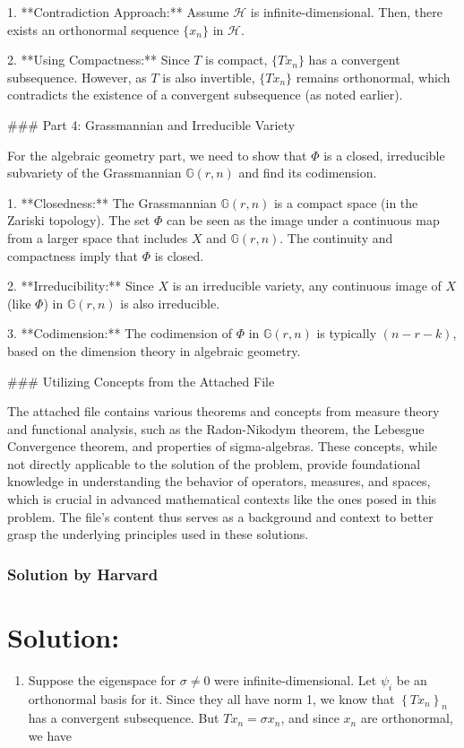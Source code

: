 \documentclass{article}
\begin{document}
1. **Contradiction Approach:** Assume \( \mathcal{H} \) is infinite-dimensional. Then, there exists an orthonormal sequence \( \{x_n\} \) in \( \mathcal{H} \).

2. **Using Compactness:** Since \( T \) is compact, \( \{Tx_n\} \) has a convergent subsequence. However, as \( T \) is also invertible, \( \{Tx_n\} \) remains orthonormal, which contradicts the existence of a convergent subsequence (as noted earlier).

### Part 4: Grassmannian and Irreducible Variety

For the algebraic geometry part, we need to show that \( \Phi \) is a closed, irreducible subvariety of the Grassmannian \( \mathbb{G}(r, n) \) and find its codimension.

1. **Closedness:** The Grassmannian \( \mathbb{G}(r, n) \) is a compact space (in the Zariski topology). The set \( \Phi \) can be seen as the image under a continuous map from a larger space that includes \( X \) and \( \mathbb{G}(r, n) \). The continuity and compactness imply that \( \Phi \) is closed.

2. **Irreducibility:** Since \( X \) is an irreducible variety, any continuous image of \( X \) (like \( \Phi \)) in \( \mathbb{G}(r, n) \) is also irreducible.

3. **Codimension:** The codimension of \( \Phi \) in \( \mathbb{G}(r, n) \) is typically \( (n - r - k) \), based on the dimension theory in algebraic geometry.

### Utilizing Concepts from the Attached File

The attached file contains various theorems and concepts from measure theory and functional analysis, such as the Radon-Nikodym theorem, the Lebesgue Convergence theorem, and properties of sigma-algebras. These concepts, while not directly applicable to the solution of the problem, provide foundational knowledge in understanding the behavior of operators, measures, and spaces, which is crucial in advanced mathematical contexts like the ones posed in this problem. The file's content thus serves as a background and context to better grasp the underlying principles used in these solutions.


\subsubsection{Solution by Harvard}

\section*{Solution:}
\begin{enumerate}
  \item Suppose the eigenspace for $\sigma \neq 0$ were infinite-dimensional. Let $\psi_{i}$ be an orthonormal basis for it. Since they all have norm 1, we know that $\left\{T x_{n}\right\}_{n}$ has a convergent subsequence. But $T x_{n}=\sigma x_{n}$, and since $x_{n}$ are orthonormal, we have
\end{enumerate}
\end{document}
